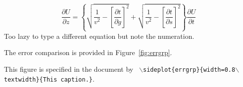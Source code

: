 \documentclass[paper,revised]{geophysics}
\begin{document}

\begin{equation}
\frac{\partial U}{\partial z} = 
\left\{
  \sqrt{\frac{1}{v^2} - \left[\frac{\partial t}{\partial g}\right]^2} +
  \sqrt{\frac{1}{v^2} - \left[\frac{\partial t}{\partial s}\right]^2}
\right\}
\frac{\partial U}{\partial t}
\label{eqn:partial2}
\end{equation}
Too lazy to type a different equation but note the numeration.

The error comparison is provided in Figure~\ref{fig:errgrp}.

{This figure is specified in the document by \texttt{
    $\backslash$sideplot\{errgrp\}\{width=0.8$\backslash$text\-width\}\{This caption.\}}.
}







\newpage


\end{document}

